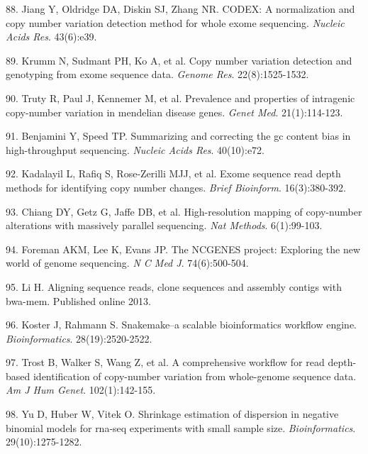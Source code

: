 \documentclass[11pt,letterpaper]{book}
\begin{document}
\leavevmode\hypertarget{ref-jiang:2015aa}{}%
88. Jiang Y, Oldridge DA, Diskin SJ, Zhang NR. CODEX: A normalization and copy number variation detection method for whole exome sequencing. \emph{Nucleic Acids Res}. 43(6):e39.

\leavevmode\hypertarget{ref-krumm:2012aa}{}%
89. Krumm N, Sudmant PH, Ko A, et al. Copy number variation detection and genotyping from exome sequence data. \emph{Genome Res}. 22(8):1525-1532.

\leavevmode\hypertarget{ref-truty:2019aa}{}%
90. Truty R, Paul J, Kennemer M, et al. Prevalence and properties of intragenic copy-number variation in mendelian disease genes. \emph{Genet Med}. 21(1):114-123.

\leavevmode\hypertarget{ref-benjamini:2012aa}{}%
91. Benjamini Y, Speed TP. Summarizing and correcting the gc content bias in high-throughput sequencing. \emph{Nucleic Acids Res}. 40(10):e72.

\leavevmode\hypertarget{ref-kadalayil:2015aa}{}%
92. Kadalayil L, Rafiq S, Rose-Zerilli MJJ, et al. Exome sequence read depth methods for identifying copy number changes. \emph{Brief Bioinform}. 16(3):380-392.

\leavevmode\hypertarget{ref-chiang:2009aa}{}%
93. Chiang DY, Getz G, Jaffe DB, et al. High-resolution mapping of copy-number alterations with massively parallel sequencing. \emph{Nat Methods}. 6(1):99-103.

\leavevmode\hypertarget{ref-foreman:2013aa}{}%
94. Foreman AKM, Lee K, Evans JP. The NCGENES project: Exploring the new world of genome sequencing. \emph{N C Med J}. 74(6):500-504.

\leavevmode\hypertarget{ref-li:2013ab}{}%
95. Li H. Aligning sequence reads, clone sequences and assembly contigs with bwa-mem. Published online 2013.

\leavevmode\hypertarget{ref-koster:2012aa}{}%
96. Koster J, Rahmann S. Snakemake--a scalable bioinformatics workflow engine. \emph{Bioinformatics}. 28(19):2520-2522.

\leavevmode\hypertarget{ref-trost:2018aa}{}%
97. Trost B, Walker S, Wang Z, et al. A comprehensive workflow for read depth-based identification of copy-number variation from whole-genome sequence data. \emph{Am J Hum Genet}. 102(1):142-155.

\leavevmode\hypertarget{ref-yu:2013aa}{}%
98. Yu D, Huber W, Vitek O. Shrinkage estimation of dispersion in negative binomial models for rna-seq experiments with small sample size. \emph{Bioinformatics}. 29(10):1275-1282.
\end{document}
